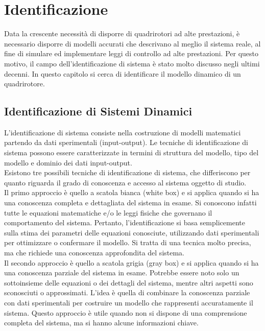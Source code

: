 
\chapter{Identificazione}\label{ch:ident}
Data la crescente necessità di disporre di quadrirotori ad alte prestazioni, è necessario disporre di modelli accurati che descrivano al meglio il sistema reale, al fine di simulare ed implementare leggi di controllo ad alte prestazioni. Per questo motivo, il campo dell'identificazione di sistema è stato molto discusso negli ultimi decenni. In questo capitolo si cerca di identificare il modello dinamico di un quadrirotore.


\section{Identificazione di Sistemi Dinamici}
L'identificazione di sistema consiste nella costruzione di modelli matematici partendo da dati sperimentali (input-output). Le tecniche di identificazione di sistema possono essere caratterizzate in termini di struttura del modello, tipo del modello e dominio dei dati input-output.\\

Esistono tre possibili tecniche di identificazione di sistema, che differiscono per quanto riguarda il grado di conoscenza e accesso al sistema oggetto di studio.\\

Il primo approccio è quello a scatola bianca (white box) e si applica quando si ha una conoscenza completa e dettagliata del sistema in esame. Si conoscono infatti tutte le equazioni matematiche e/o le leggi fisiche che governano il comportamento del sistema. Pertanto, l'identificazione si basa semplicemente sulla stima dei parametri delle equazioni conosciute, utilizzando dati sperimentali per ottimizzare o confermare il modello. Si tratta di una tecnica molto precisa, ma che richiede una conoscenza approfondita del sistema.\\

Il secondo approccio è quello a scatola grigia (gray box) e si applica quando si ha una conoscenza parziale del sistema in esame. Potrebbe essere noto solo un sottoinsieme delle equazioni o dei dettagli del sistema, mentre altri aspetti sono sconosciuti o approssimati. L'idea è quella di combinare la conoscenza parziale con dati sperimentali per costruire un modello che rappresenti accuratamente il sistema. Questo approccio è utile quando non si dispone di una comprensione completa del sistema, ma si hanno alcune informazioni chiave.\\


